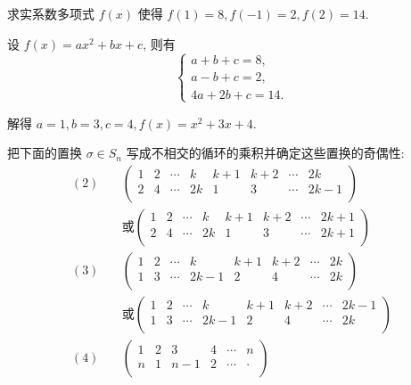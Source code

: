 \documentclass[color=black,device=normal,lang=cn,mode=geye]{elegantnote}
\begin{document}
\begin{exercisec}[1.5.1]
    求实系数多项式 $f(x)$ 使得 $f(1)=8,f(-1)=2,f(2)=14$.
\end{exercisec}
\begin{solution}
    设 $f(x)=ax^2+bx+c$, 则有
    \[\begin{cases}
        a+b+c=8, \\
        a-b+c=2, \\
        4a+2b+c=14.
    \end{cases}\]

    解得 $a=1,b=3,c=4,f(x)=x^2+3x+4$.
\end{solution}
\begin{exercisec}[2.3.2, 2.3.5]
    把下面的置换 $\sigma\in S_n$ 写成不相交的循环的乘积并确定这些置换的奇偶性:
    \begin{align*}
        (2)\quad & \begin{pmatrix}
            1 & 2 & \cdots & k & k+1 & k+2 & \cdots & 2k \\
            2 & 4 & \cdots & 2k & 1 & 3 & \cdots & 2k-1 \\
        \end{pmatrix} \\
        & \text{或} \begin{pmatrix}
            1 & 2 & \cdots & k & k+1 & k+2 & \cdots & 2k+1 \\
            2 & 4 & \cdots & 2k & 1 & 3 & \cdots & 2k+1 \\
        \end{pmatrix} \\
        (3)\quad & \begin{pmatrix}
            1 & 2 & \cdots & k & k+1 & k+2 & \cdots & 2k \\
            1 & 3 & \cdots & 2k-1 & 2 & 4 & \cdots & 2k \\
        \end{pmatrix} \\
        & \text{或} \begin{pmatrix}
            1 & 2 & \cdots & k & k+1 & k+2 & \cdots & 2k-1 \\
            1 & 3 & \cdots & 2k-1 & 2 & 4 & \cdots & 2k \\
        \end{pmatrix} \\
        (4)\quad & \begin{pmatrix}
            1 & 2 & 3 & 4 & \cdots & n \\
            n & 1 & n-1 & 2 & \cdots & \cdot \\
        \end{pmatrix}
    \end{align*}
\end{exercisec}
\end{document}

